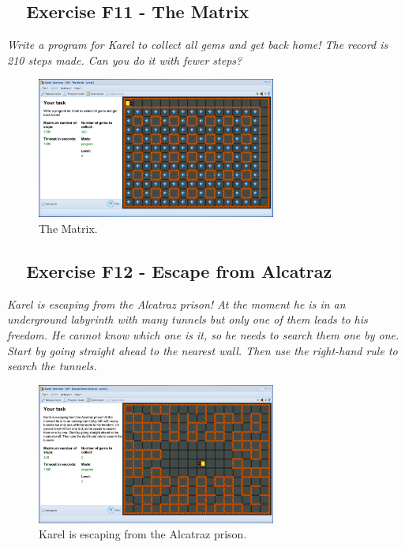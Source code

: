 \documentclass[article,A4,12pt]{llncs}
\begin{document}
\newpage

\subsection{\ \ Exercise F11 - The Matrix}

{\em Write a program for Karel to collect all gems and get back home! The record is 
210 steps made. Can you do it with fewer steps?}

\begin{figure}[!ht]
\begin{center}
\includegraphics[width=0.7\textwidth]{img/g06.png}
\end{center}
\vspace{-4mm}
\caption{The Matrix.}
\label{fig:g06}
\vspace{-10mm}
\end{figure}
\noindent

\subsection{\ \ Exercise F12 - Escape from Alcatraz}

{\em Karel is escaping from the Alcatraz prison! At the moment he is in an underground labyrinth with many tunnels but only one of them leads to his freedom. He cannot know which one is it, so he needs to search them one by one. Start by going straight ahead to the nearest wall. Then use the right-hand rule to search the tunnels.}

\newpage

\begin{figure}[!ht]
\begin{center}
\includegraphics[width=0.7\textwidth]{img/g07.png}
\end{center}
\vspace{-4mm}
\caption{Karel is escaping from the Alcatraz prison.}
\label{fig:g07}
\vspace{-8mm}
\end{figure}
\noindent
\end{document}
